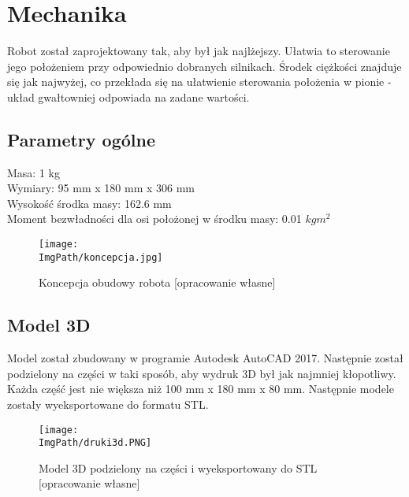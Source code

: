 \documentclass[a4paper,12pt,twoside,openany]{report}
\newcommand{\ImgPath}{.}
\begin{document}
\chapter{Mechanika}
Robot został zaprojektowany tak, aby był jak najlżejszy. Ułatwia to sterowanie jego położeniem przy odpowiednio dobranych silnikach. Środek ciężkości znajduje się jak najwyżej, co przekłada się na ułatwienie sterowania położenia w pionie - układ gwałtowniej odpowiada na zadane wartości.

\section{Parametry ogólne}

\noindent Masa: 1 kg\\
Wymiary: 95 mm x 180 mm x 306 mm\\
Wysokość środka masy: 162.6 mm\\
Moment bezwładności dla osi położonej w środku masy: 0.01 $kgm^2$\\

\begin{figure}[!htbp]
	\begin{center}
\centering
\texttt{[image: \\ImgPath/koncepcja.jpg]}
\end{center}
	\caption{Koncepcja obudowy robota [opracowanie własne]}
	\label{model3d}
\end{figure}

\newpage
\section{Model 3D}
Model został zbudowany w programie Autodesk AutoCAD 2017. Następnie został podzielony na części w taki sposób, aby wydruk 3D był jak najmniej kłopotliwy. Każda część jest nie większa niż 100 mm x 180 mm x 80 mm. Następnie modele zostały wyeksportowane do formatu STL.

\begin{figure}[!htbp]
	\begin{center}
\centering
\texttt{[image: \\ImgPath/druki3d.PNG]}
\end{center}
	\caption{Model 3D podzielony na części i wyeksportowany do STL [opracowanie własne]}
	\label{druki3d}
\end{figure}

\end{document}
